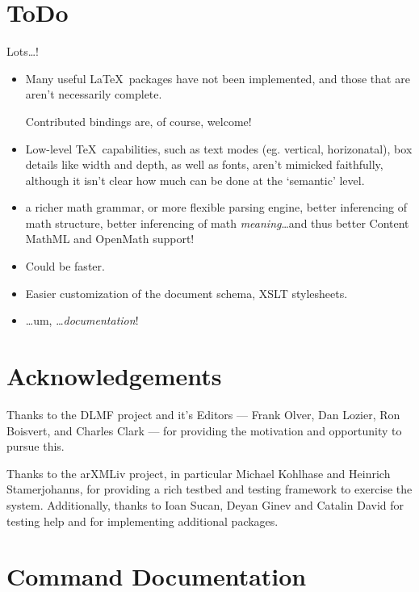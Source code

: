 \documentclass{book}
\begin{document}
\chapter{ToDo}\label{todo}
Lots\ldots!
\begin{itemize}
\item Many useful \LaTeX\ packages have not been implemented, and those
  that are aren't necessarily complete.

  Contributed bindings are, of course, welcome!
\item Low-level \TeX\ capabilities, such as text modes (eg. vertical, horizonatal),
 box details like width and depth, as well as fonts,  aren't mimicked faithfully,
  although it isn't clear how much can be done at the `semantic' level.
\item a richer math grammar, or more flexible parsing engine,
  better inferencing of math structure,
  better inferencing of math \emph{meaning}\ldots and thus better
  Content MathML and OpenMath support!
\item Could be faster.
\item Easier customization of the document schema, XSLT stylesheets.
\item \ldots um, \ldots \emph{documentation}!
\end{itemize}

\chapter*{Acknowledgements}\label{acknowledgements}
Thanks to the DLMF project and it's Editors ---
Frank Olver, Dan Lozier, Ron Boisvert, and Charles Clark ---
for providing the motivation and opportunity to pursue this.

Thanks to the arXMLiv project, in particular Michael Kohlhase and Heinrich Stamerjohanns,
for providing a rich testbed and testing framework to exercise the system.
Additionally, thanks to Ioan Sucan, Deyan Ginev
and Catalin David for testing help and for implementing additional packages.

\appendix
\chapter[Commands]{Command Documentation}\label{commands}





\end{document}
